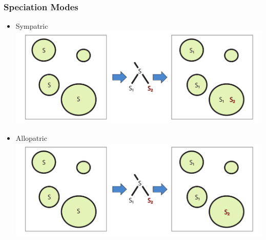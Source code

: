 \documentclass[11pt,t]{beamer}
\begin{document}
\begin{frame}
	\frametitle{Speciation Modes}
	\begin{itemize}
		\item Sympatric \\
			\includegraphics[scale=0.3]{sympatric-speciation.pdf}
		\item Allopatric \\
			\includegraphics[scale=0.3]{allopatric-speciation.pdf}			
	\end{itemize}
\end{frame}
\end{document}
